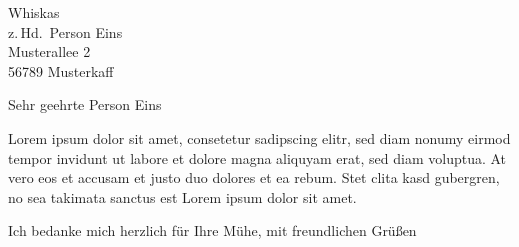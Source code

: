 \documentclass[a4paper, foldmarks=vpmBT]{scrlttr2}
\begin{document}
	\begin{letter}{Whiskas\\
					z.\,Hd.\ Person Eins\\
					Musterallee 2\\[.05cm]
					56789 Musterkaff}
		
		\opening{Sehr geehrte Person Eins}
		
    
    Lorem ipsum dolor sit amet, consetetur sadipscing elitr, sed diam nonumy eirmod
    tempor invidunt ut labore et dolore magna aliquyam erat, sed diam voluptua. At
    vero eos et accusam et justo duo dolores et ea rebum. Stet clita kasd
    gubergren, no sea takimata sanctus est Lorem ipsum dolor sit amet.

		\closing{Ich bedanke mich herzlich für Ihre Mühe, mit freundlichen Grüßen\vspace{.5cm}}
		
	\end{letter}
	
\end{document}
